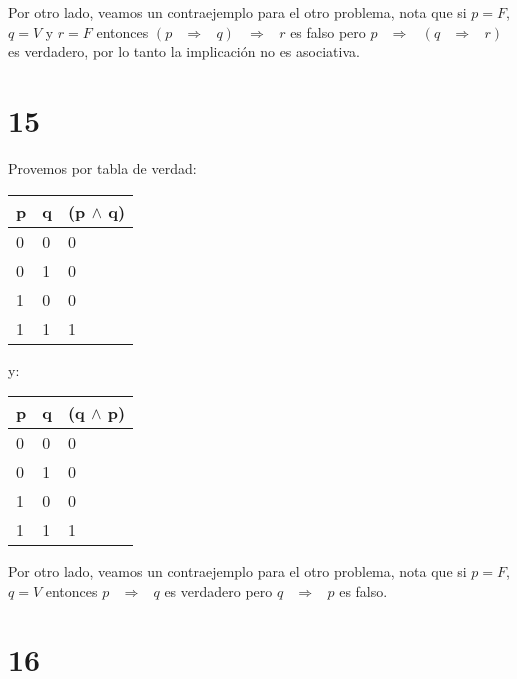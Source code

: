 \documentclass[12pt, fleqn]{article}                            %
\DeclareMathOperator \Space     {\quad}                         %
\DeclareMathOperator \MiniSpace {\;}                            %
\theoremstyle{break}                                            %
\newcommand \lInfire {\MiniSpace \Rightarrow \MiniSpace}        %
\begin{document}
    Por otro lado, veamos un contraejemplo para el otro problema, 
    nota que si $p = F$, $q = V$ y $r = F$ 
    entonces $(p \lInfire q) \lInfire r$ es falso pero $p \lInfire (q \lInfire r)$
    es verdadero, por lo tanto la implicación no es asociativa.




\clearpage
\section{15}

    Provemos por tabla de verdad:\\
    \begin{tabular}{|l|l|l|} 
        \hline
        p & q  & (p $\wedge$ q)   \\ \hline
        0 & 0  &        0         \\ \hline 
        0 & 1  &        0         \\ \hline 
        1 & 0  &        0         \\ \hline 
        1 & 1  &        1         \\ \hline 
    \end{tabular}

    y:\\
    \begin{tabular}{|l|l|l|} 
        \hline
        p & q  & (q $\wedge$ p)   \\ \hline
        0 & 0  &        0         \\ \hline 
        0 & 1  &        0         \\ \hline 
        1 & 0  &        0         \\ \hline 
        1 & 1  &        1         \\ \hline 
    \end{tabular}

  

    Por otro lado, veamos un contraejemplo para el otro problema, 
    nota que si $p = F$, $q = V$ entonces $p \lInfire q$ es verdadero
    pero $q \lInfire p$ es falso.





\section{16}
\end{document}
